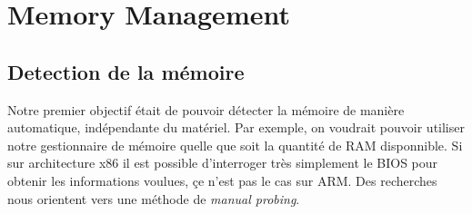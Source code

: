 \documentclass[frenchb]{article}
\begin{document}
\section{Memory Management}

\subsection{Detection de la mémoire}
Notre premier objectif était de pouvoir détecter la mémoire de manière automatique, indépendante du matériel. Par exemple, on voudrait pouvoir utiliser notre gestionnaire de mémoire quelle que soit la quantité de RAM disponnible.  Si sur architecture x86 il est possible d'interroger très simplement le BIOS pour obtenir les informations voulues, çe n'est pas le cas sur ARM. Des recherches nous orientent vers une méthode de \textit{manual probing}.
\end{document}
